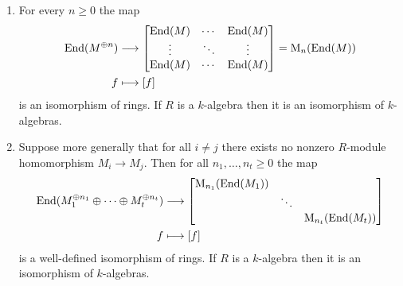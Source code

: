\begin{corollary}
  \label{corollary: decomposition of endomorphisms for orthogonal modules}
  \leavevmode
  \begin{enumerate}
    \item
      For every $n \geq 0$ the map
      \begin{align*}
                  \operatorname{End}(M^{\oplus n})
        &\longrightarrow  \begin{bmatrix}
                    \operatorname{End}(M) & \cdots  & \operatorname{End}(M) \\
                    \vdots  & \ddots  & \vdots  \\
                    \operatorname{End}(M) & \cdots  & \operatorname{End}(M)
                  \end{bmatrix}
        =        \operatorname{M}_n( \operatorname{End}(M) )
        \\
                      f
        &\longmapsto  [f]
      \end{align*}
      is an isomorphism of rings.
      If $R$ is a $k$-algebra then it is an isomorphism of $k$-algebras.
    \item
      Suppose more generally that for all $i \neq j$ there exists no nonzero $R$-module homomorphism $M_i \to M_j$. Then for all $n_1, \dotsc, n_t \geq 0$ the map
      \begin{align*}
                  \operatorname{End}(M_1^{\oplus n_1} \oplus \dotsb \oplus M_t^{\oplus n_t})
        &\longrightarrow  \begin{bmatrix}
                      \operatorname{M}_{n_1}( \operatorname{End}(M_1) )
                    & {}
                    & {}
                    \\
                      {}
                    & \ddots
                    & {}
                    \\
                      {}
                    & {}
                    & \operatorname{M}_{n_t}( \operatorname{End}(M_t) )
                  \end{bmatrix}
        \\
                      f
        &\longmapsto  [f]
      \end{align*}
      is a well-defined isomorphism of rings.
      If $R$ is a $k$-algebra then it is an isomorphism of $k$-algebras.
  \end{enumerate}
\end{corollary}





